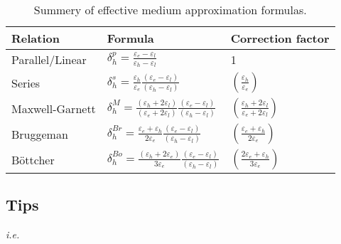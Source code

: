 \renewcommand\arraystretch{1.8}
\begin{table}
\caption{Summery of effective medium approximation formulas.}\label{tab:formula}
  \centering
  \begin{tabular}{lll}
  \hline
Relation & Formula &  Correction factor \\
\hline
Parallel/Linear &  $\delta_h^p = \frac{\varepsilon_{e}-\varepsilon_{l}}{\varepsilon_{h}-\varepsilon_{l}}$
       &   1 \\
Series & $\delta_h^s= \frac{\varepsilon_{h}}{\varepsilon_{e}}\frac{(\varepsilon_{e}-\varepsilon_{l})}{(\varepsilon_{h}-\varepsilon_{l})}$
& $\left(\frac{\varepsilon_h}{\varepsilon_e}\right)$\\
 Maxwell-Garnett &
$\delta_{h}^M
=\frac{(\varepsilon_{h}+2\varepsilon_{l})}{(\varepsilon_{e}+2\varepsilon_{l})}\frac{(\varepsilon_{e}-\varepsilon_{l})}{(\varepsilon_{h}-\varepsilon_{l})}
$&$\left(\frac{\varepsilon_{h}+2\varepsilon_{l}}{\varepsilon_{e}+2\varepsilon_{l}}\right)$\\
Bruggeman &  $\delta_h^{Br}= \frac{\varepsilon_{e}+\varepsilon_{h}}{2\varepsilon_{e}}\frac{(\varepsilon_{e}-\varepsilon_{l})}{(\varepsilon_{h}-\varepsilon_{l})}$
& $\left(\frac{\varepsilon_{e}+\varepsilon_{h}}{2\varepsilon_{e}}\right)$\\
B\"{o}ttcher &  $\delta_h^{Bo}=
  \frac{(\varepsilon_h+2\varepsilon_e)}{3\varepsilon_e}\frac{(\varepsilon_{e}-\varepsilon_{l})}{(\varepsilon_{h}-\varepsilon_{l})}$
&$ \left(\frac{2\varepsilon_{e}+\varepsilon_{h}}{3\varepsilon_{e}}\right)$ \\ \hline
  \end{tabular}
\end{table}
\renewcommand\arraystretch{1}


\subsection{Tips}

\emph{i.e.}